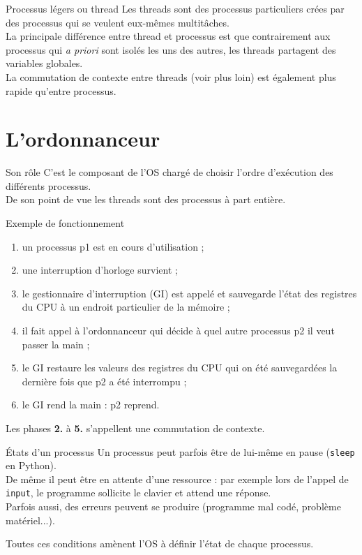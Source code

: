 \documentclass[10pt]{nsibeamer}
\begin{document}
\begin{frame}{Processus légers ou thread}\pause
Les \alert{threads} sont des processus particuliers crées par des processus qui se veulent eux-mêmes multitâches.\\\pause
La principale différence entre thread et processus est que contrairement aux processus qui \textit{a priori} sont isolés les uns des autres, les threads \alert{partagent des variables globales}.\\\pause
La commutation de contexte entre threads (voir plus loin) est également plus rapide qu'entre processus.\\

\end{frame}

\section{L'ordonnanceur}

\begin{frame}{Son rôle}\pause
C'est le composant de l'OS chargé de \alert{choisir l'ordre d'exécution} des différents processus.\\\pause
De son point de vue les threads sont des processus à part entière.
\end{frame}
\begin{frame}{Exemple de fonctionnement}\pause
\begin{enumerate}[\bfseries 1.]
	\item un processus p1 est en cours d'utilisation ;\pause
    \item une interruption d'horloge survient ;\pause
    \item le \alert{gestionnaire d'interruption} (GI) est appelé et sauvegarde l'état des registres du CPU à un endroit particulier de la mémoire ;\pause
    \item il fait appel à l'\alert{ordonnanceur} qui \alert{décide} à quel autre processus p2  il veut passer la main ;\pause
    \item le GI restaure les valeurs des registres du CPU qui on été sauvegardées la dernière fois que p2 a été interrompu ;\pause
    \item le GI rend la main : p2 reprend.
\end{enumerate}
Les phases \textbf{2.} à \textbf{5.} s'appellent une \alert{commutation de contexte}.\pause
\end{frame}
\begin{frame}{\'Etats d'un processus}\pause
Un processus peut parfois être de lui-même en pause (\texttt{sleep} en Python).\\\pause
De même il peut être en attente d'une ressource : par exemple lors de l'appel de \texttt{input}, le programme sollicite le clavier et attend une réponse.\\\pause
Parfois aussi, des erreurs peuvent se produire (programme mal codé, problème matériel...).\\\pause

Toutes ces conditions amènent l'OS à définir l'\alert{état} de chaque processus.
\end{frame}
\end{document}
